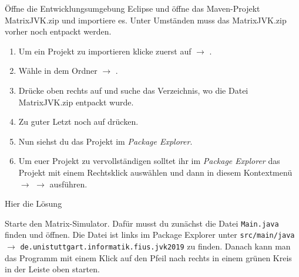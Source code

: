 \newcommand{\jvkpackage}{MatrixJVK.zip }
\newcommand{\solutionPackage}{\texttt{de.unistuttgart.informatik.fius.jvk2019.solutions}}
\newcommand{\simulator}{Matrix-Simulator}

\begin{questions}

    \renewcommand{\workingtimeMinutes}{10}

    Öffne die Entwicklungsumgebung Eclipse und öffne das Maven-Projekt \jvkpackage und importiere es.
    Unter Umständen muss das \jvkpackage vorher noch entpackt werden.
    \begin{enumerate}
        \item Um ein Projekt zu importieren klicke zuerst auf  $\rightarrow$      .
        \item Wähle in dem Ordner  $\to$ .
        \item Drücke oben rechts auf  und suche das Verzeichnis, wo die Datei \jvkpackage entpackt wurde.
        \item Zu guter Letzt noch auf  drücken.
        \item Nun siehst du das Projekt im \textit{Package Explorer}.
        \item Um euer Projekt zu vervollständigen solltet ihr im \textit{Package Explorer} das Projekt mit einem Rechtsklick auswählen und dann in diesem Kontextmenü  $\rightarrow$  $\rightarrow$  ausführen.
    \end{enumerate}
    \begin{solution}
    Hier die Lösung
    \end{solution}

    \renewcommand{\workingtimeMinutes}{15}

    Starte den \simulator.
    Dafür musst du zunächst die Datei \texttt{Main.java} finden und öffnen.
    Die Datei ist links im Package Explorer unter \texttt{src/main/java} $\to$ \texttt{de.unistuttgart.informatik.fius.jvk2019} zu finden.
    Danach kann man das Programm mit einem Klick auf den Pfeil nach rechts in einem grünen Kreis in der Leiste oben starten.

\end{questions}
